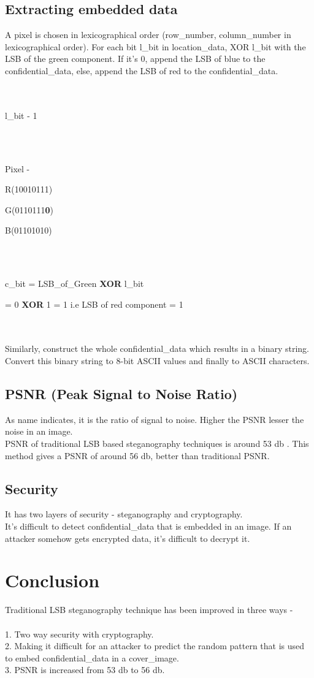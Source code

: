 \documentclass[conference]{IEEEtran}
\begin{document}
\subsection{Extracting embedded data}
A pixel is chosen in lexicographical order (row\_number, column\_number in lexicographical order).
For each bit l\_bit in location\_data, XOR l\_bit with the LSB of the green component.
If it's 0, append the LSB of blue to the confidential\_data, else, append the LSB of red to the confidential\_data.\\
\\ \\
\centerline{l\_bit - 1}
\leavevmode \\ \\
\centerline{Pixel - }
\centerline{R(10010111)}
\centerline{G(0110111\textbf{0})}
\centerline{B(01101010)}
\leavevmode \\ \\
\centerline{c\_bit = LSB\_of\_Green \textbf{XOR} l\_bit}
\centerline{ = 0 \textbf{XOR} 1 = 1 i.e LSB of red component = 1 }
\leavevmode \\ \\

Similarly, construct the whole confidential\_data which results in a binary string.
Convert this binary string to 8-bit ASCII values and finally to ASCII characters.\\
\subsection{PSNR (Peak Signal to Noise Ratio)}
As name indicates, it is the ratio of signal to noise.
Higher the PSNR lesser the noise in an image.\\

PSNR of traditional LSB based steganography techniques is around 53 db \cite{b1}.
This method gives a PSNR of around 56 db, better than traditional PSNR.\\  
\subsection{Security}
It has two layers of security - steganography and cryptography.\\

It's difficult to detect confidential\_data that is embedded in an image.
If an attacker somehow gets encrypted data, it's difficult to decrypt it.\\
\section{Conclusion}
Traditional LSB steganography technique has been improved in three ways -\\ \\
1. Two way security with cryptography.\\
2. Making it difficult for an attacker to predict the random pattern that is used to embed confidential\_data in a cover\_image.\\
3. PSNR is increased from 53 db to 56 db.\\
\end{document}

